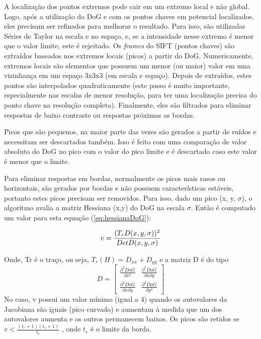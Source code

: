 A localização dos pontos extremos pode cair em um extremo local e não global. Logo, após a utilização do DoG e com os pontos chaves em potencial localizados, eles precisam ser refinados para melhorar o resultado. Para isso, são utilizadas Séries de Taylor na escala e no espaço, e, se a intensidade nesse extremo é menor que o valor limite, este é rejeitado.
Os {\it frames} do SIFT (pontos chaves) são extraídos baseados nos extremos locais (picos) a partir do DoG. Numericamente, extremos locais são elementos que possuem um menor (ou maior) valor em uma vizinhança em um espaço 3x3x3 (em escala e espaço).
Depois de extraídos, estes pontos são interpolados quadraticamente (este passo é muito importante, especialmente nas escalas de menor resolução, para ter uma localização precisa do ponto chave na resolução completa). Finalmente, eles são filtrados para eliminar respostas de baixo contraste ou respostas próximas as bordas.


Picos que são pequenos, na maior parte das vezes são gerados a partir de ruídos e necessitam ser descartados também. Isso é feito com uma comparação de valor absoluto do DoG no pico com o valor do pico limite e é descartado caso este valor é menor que o limite.




Para eliminar respostas em bordas, normalmente os picos mais rasos ou horizontais, são gerados por bordas e não possuem características estáveis, portanto estes picos precisam ser removidos. Para isso, dado um pico (x, y, $\sigma$), o algoritmo avalia a matriz Hessiana (x,y) do DoG na escala $\sigma$. Então é computado um valor para esta equação (\ref{eq:hessianaDoG}):

\begin{equation}
	v = \frac{( T_r \space D(x,y,\sigma))^2}{Det \space D(x,y,\sigma)}
	\label{eq:hessianaDoG}
\end{equation}

Onde, Tr é o traço, ou seja, $T_r(H) = D_{xx} + D_{yy}$ e a matriz D é do tipo
\[D = \begin{bmatrix}
	\frac{\partial ^2 DoG}{\partial x^2} & \frac{\partial ^2 DoG}{\partial x \partial y} \\ 
	\frac{\partial ^2 DoG}{\partial x \partial y} & \frac{\partial ^2 DoG}{\partial y^2} 
\end{bmatrix}
\]
No caso, v possui um valor mínimo (igual a 4) quando os autovalores da Jacobiana são iguais (pico curvado) e aumentam à medida que um dos autovalores aumenta e os outros permanecem baixos. Os picos são retidos se $v  < \frac{(t_e+1)(t_e+1)}{t_e}$ , onde $t_e$ é o limite da borda. 

